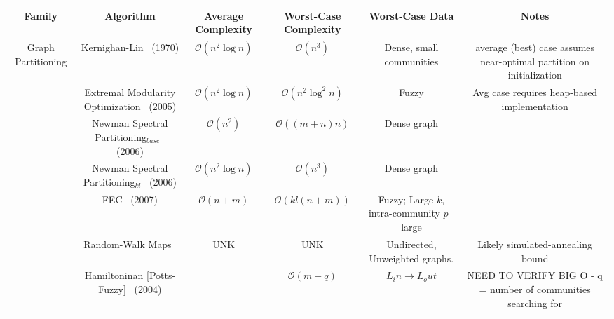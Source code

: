 \begin{landscape}
  \footnotesize
    \begin{table}[t]
      \begin{tabular}{|c|c|c|c|c|c|}
        \hline
        Family & Algorithm & Average Complexity & Worst-Case Complexity & Worst-Case Data & Notes \\
        \hline
        \multirow{9}{*}{Graph Partitioning}       & Kernighan-Lin~\cite{Kernighan1970} (1970) & $\mathcal{O}(n^2\log{n})$ & $\mathcal{O}(n^3)$ & Dense, small communities & average (best) case assumes near-optimal partition on initialization \\
                                                  
                                                  & Extremal Modularity Optimization~\cite{Duch2005} (2005) & $\mathcal{O}(n^2\log{n})$ & $\mathcal{O}(n^2\log^2{n})$ & Fuzzy & Avg case requires heap-based implementation \\
                                                  
                                                  & Newman Spectral Partitioning$_{base}$~\cite{Newman2006} (2006) &
                                                  $\mathcal{O}(n^2)$ & $\mathcal{O}((m+n)n)$ & Dense graph & \\
                                                  
                                                  & Newman Spectral Partitioning$_{kl}$~\cite{Newman2006} (2006) &
                                                  $\mathcal{O}(n^2\log{n})$ & $\mathcal{O}(n^3)$ & Dense graph & \\
                                                  
                                                  & FEC~\cite{Yang2007} (2007)            & $\mathcal{O}(n+m)$        &$\mathcal{O}(kl(n+m))$ & Fuzzy; Large $k$, intra-community $p_-$ large &  \\
                                                  
                                                  & Random-Walk Maps~\cite{Rosvall2008} & UNK & UNK & Undirected, Unweighted graphs. & Likely simulated-annealing bound\\

                                                  & Hamiltoninan [Potts-Fuzzy]~\cite{Reichardt2004} (2004) & & $\mathcal{O}(m+q)$& $L_in\rightarrow L_out$ & NEED TO VERIFY BIG O - q = number of communities searching for \\
                                                  

\end{tabular}
\end{table}
\end{landscape}
